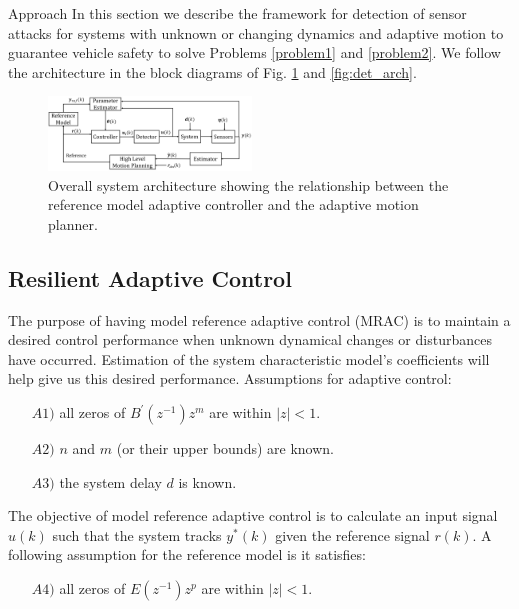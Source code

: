 
\begin{section}{Approach}
\label{sec:approach}
In this section we describe the framework for detection of sensor attacks for systems with unknown or changing dynamics and adaptive motion to guarantee vehicle safety to solve Problems \ref{problem1} and \ref{problem2}. We follow the architecture in the block diagrams of Fig. \ref{fig:system_arch} and \ref{fig:det_arch}. 



\begin{figure}[ht!]
\vspace{1pt}
\centering
\includegraphics[width=0.48\textwidth]{sys_arch.png}
\caption{Overall system architecture showing the relationship between the reference model adaptive controller and the adaptive motion planner.}
\label{fig:system_arch}
\end{figure}

\subsection{Resilient Adaptive Control}
\label{sec:Res_adapt_control}

The purpose of having model reference adaptive control (MRAC) is to maintain a desired control performance when unknown dynamical changes or disturbances have occurred. Estimation of the system characteristic model's coefficients will help give us this desired performance.
Assumptions for adaptive control: 
	\begin{enumerate}[leftmargin=4\parindent]
	\item[$A1)$] all zeros of $B^{'}(z^{-1})z^m$ are within $|z|<1$. 
	\item[$A2)$] $n$ and $m$ (or their upper bounds) are known. 
	\item[$A3)$] the system delay $d$ is known.
	\end{enumerate}
The objective of model reference adaptive control is to calculate an input signal $u(k)$ such that the system tracks $y^{*}(k)$ given the reference signal $r(k)$. 
A following assumption for the reference model is it satisfies:
    \begin{enumerate}[leftmargin=4\parindent]
	\item[$A4)$] all zeros of $E(z^{-1})z^p$ are within $|z|<1$. 
	\end{enumerate}


\end{section}
